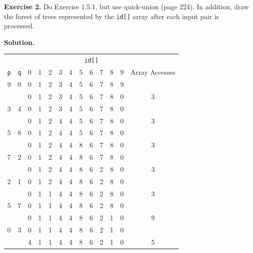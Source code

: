 \documentclass[12pt, a4paper]{article}
\newenvironment{ex}[2][Exercise]
{\par\medskip\noindent \textbf{#1 #2.}}
{\medskip}
\newenvironment{sol}[1][Solution]
{\par\medskip\noindent \textbf{#1.} }
{\medskip}
\begin{document}
	\begin{ex}{2}
		Do Exercise 1.5.1, but use quick-union (page 224). In addition, draw the forest of trees
		represented by the \texttt{id[]} array after each input pair is processed.
	\end{ex}
	\begin{sol}
		\begin{center}
			\begin{tabular}{cc|cccccccccc|c}
				\multicolumn{13}{c}{\texttt{id[]}}\\
				\texttt{p} & \texttt{q} & 0 & 1 & 2 & 3 & 4 & 5 & 6 & 7 & 8 & 9 & Array Accesses\\
				\hline
				9  & 0  & {\color{green} 0} & 1 & 2 & 3 & 4 & 5 & 6 & 7 & 8 & {\color{green} 9} & {}\\
				{} & {} & 0 & 1 & 2 & 3 & 4 & 5 & 6 & 7 & 8 & {\color{red} 0} & 3\\
				
				3  & 4  & 0 & 1 & 2 & {\color{green} 3} & {\color{green} 4} & 5 & 6 & 7 & 8 & 0 & {}\\
				{} & {} & 0 & 1 & 2 & {\color{red} 4} & 4 & 5 & 6 & 7 & 8 & 0 & 3\\
				
				5  & 8  & 0 & 1 & 2 & 4 & 4 & {\color{green} 5} & 6 & 7 & {\color{green} 8} & 0 & {}\\
				{} & {} & 0 & 1 & 2 & 4 & 4 & {\color{red} 8} & 6 & 7 & 8 & 0 & 3\\
				
				7  & 2  & 0 & 1 & {\color{green} 2} & 4 & 4 & 8 & 6 & {\color{green} 7} & 8 & 0 & {}\\
				{} & {} & 0 & 1 & 2 & 4 & 4 & 8 & 6 & {\color{red} 2} & 8 & 0 & 3\\
				
				2  & 1  & 0 & {\color{green} 1} & {\color{green} 2} & 4 & 4 & 8 & 6 & {\color{green} 2} & 8 & 0 & {}\\
				{} & {} & 0 & 1 & {\color{red} 1} & 4 & 4 & 8 & 6 & 2 & 8 & 0 & 3\\
				
				5  & 7  & 0 & {\color{green} 1} & {\color{green} 1} & 4 & 4 & {\color{green} 8} & 6 & {\color{green} 2} & {\color{green} 8} & 0 & {}\\
				{} & {} & 0 & 1 & 1 & 4 & 4 & 8 & 6 & 2 & {\color{red} 1} & 0 & 9\\
				
				0  & 3  & {\color{green}0} & 1 & 1 & {\color{green} 4} & {\color{green} 4} & 8 & 6 & 2 & 1 & {\color{green} 0} & {}\\
				{} & {} & {\color{red} 4} & 1 & 1 & 4 & 4 & 8 & 6 & 2 & 1 & 0 & 5\\
				

\end{tabular}
\end{center}
\end{sol}
\end{document}
